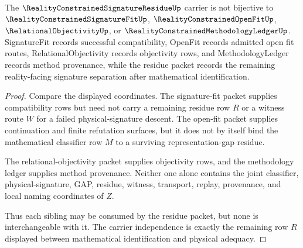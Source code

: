 \begin{theorem}
\label{thm:reality-constrained-signature-residue-sibling-independence}
The $\RealityConstrainedSignatureResidueUp$ carrier is not bijective to $\RealityConstrainedSignatureFitUp$, $\RealityConstrainedOpenFitUp$, $\RelationalObjectivityUp$, or $\RealityConstrainedMethodologyLedgerUp$. SignatureFit records successful compatibility, OpenFit records admitted open fit routes, RelationalObjectivity records objectivity rows, and MethodologyLedger records method provenance, while the residue packet records the remaining reality-facing signature separation after mathematical identification.
\end{theorem}
\begin{proof}
Compare the displayed coordinates. The signature-fit packet supplies compatibility rows but need not carry a remaining residue row $R$ or a witness route $W$ for a failed physical-signature descent. The open-fit packet supplies continuation and finite refutation surfaces, but it does not by itself bind the mathematical classifier row $M$ to a surviving representation-gap residue.

The relational-objectivity packet supplies objectivity rows, and the methodology ledger supplies method provenance. Neither one alone contains the joint classifier, physical-signature, GAP, residue, witness, transport, replay, provenance, and local naming coordinates of $Z$.

Thus each sibling may be consumed by the residue packet, but none is interchangeable with it. The carrier independence is exactly the remaining row $R$ displayed between mathematical identification and physical adequacy.
\end{proof}



